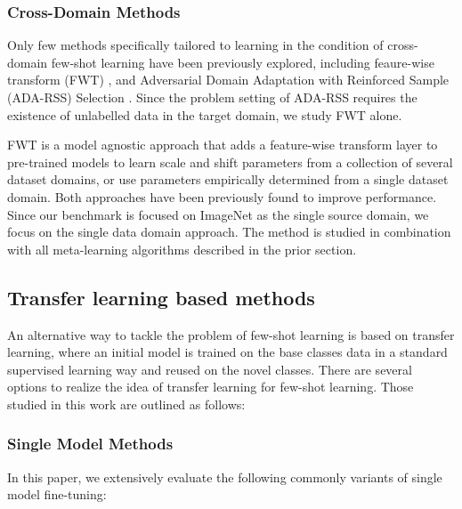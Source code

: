 \documentclass[runningheads]{llncs}
\begin{document}
\subsubsection{Cross-Domain Methods}

Only few methods specifically tailored to learning in the condition of cross-domain few-shot learning have been previously explored, including feaure-wise transform (FWT) \cite{tsengcrossdomain}, and Adversarial Domain Adaptation with Reinforced Sample (ADA-RSS)
Selection \cite{dongxing}. Since the problem setting of ADA-RSS requires the existence of unlabelled data in the target domain, we study FWT alone. 

FWT is a model agnostic approach that adds a feature-wise transform layer to pre-trained models to learn scale and shift parameters from a collection of several dataset domains, or use parameters empirically determined from a single dataset domain. Both approaches have been previously found to improve performance. Since our benchmark is focused on ImageNet as the single source domain, we focus on the single data domain approach. The method is studied in combination with all meta-learning algorithms described in the prior section. 


\subsection{Transfer learning based methods}
An alternative way to tackle the problem of few-shot learning is based on transfer learning, where an initial model  is trained on the base classes data in a standard supervised learning way and reused on the novel classes. There are several options to realize the idea of transfer learning for few-shot learning. Those studied in this work are outlined as follows:



\subsubsection{Single Model Methods}
 In this paper, we extensively evaluate the following commonly variants of single model fine-tuning:
\end{document}
